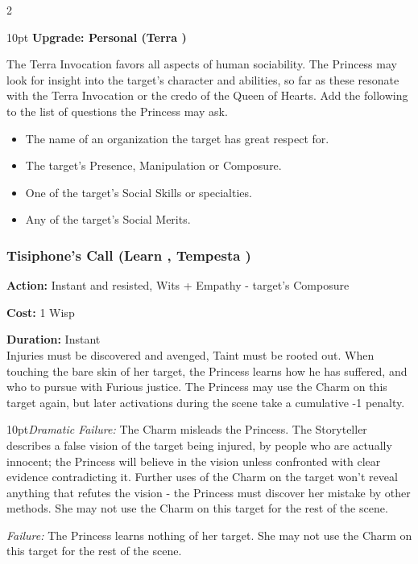\begin{multicols}{2}
\begin{myindentpar}{10pt}
\textbf{Upgrade: Personal (Terra \textbullet\textbullet)}

The Terra Invocation favors all aspects of human sociability. The Princess may look for insight into the target's character and abilities, so far as these resonate with the Terra Invocation or the credo of the Queen of Hearts. Add the following to the list of questions the Princess may ask.
\begin{itemize}
\item The name of an organization the target has great respect for. 
\item The target's Presence, Manipulation or Composure.
\item One of the target's Social Skills or specialties.
\item Any of the target's Social Merits.\end{itemize}\end{myindentpar}

\subsubsection*{Tisiphone's Call (Learn \textbullet\textbullet, Tempesta \textbullet)}

\noindent \textbf{Action:} Instant and resisted, Wits + Empathy - target's Composure

\noindent \textbf{Cost:} 1 Wisp

\noindent \textbf{Duration:} Instant\\

Injuries must be discovered and avenged, Taint must be rooted out. When touching the bare skin of her target, the Princess learns how he has suffered, and who to pursue with Furious justice. The Princess may use the Charm on this target again, but later activations during the scene take a cumulative -1 penalty.

\begin{myindentpar}{10pt}\emph{Dramatic Failure:} The Charm misleads the Princess. The Storyteller describes a false vision of the target being injured, by people who are actually innocent; the Princess will believe in the vision unless confronted with clear evidence contradicting it. Further uses of the Charm on the target won't reveal anything that refutes the vision - the Princess must discover her mistake by other methods. She may not use the Charm on this target for the rest of the scene.

\emph{Failure:} The Princess learns nothing of her target. She may not use the Charm on this target for the rest of the scene.


\end{myindentpar}
\end{multicols}
